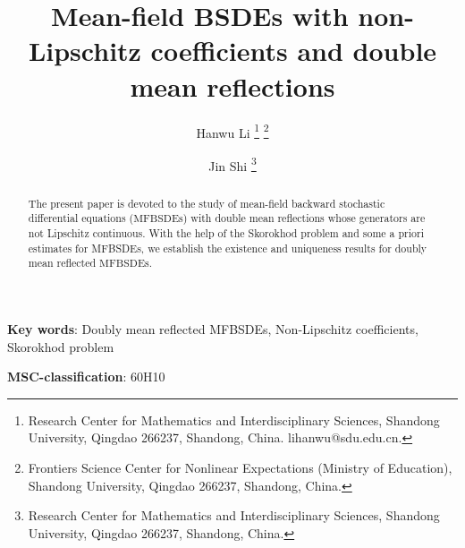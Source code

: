\documentclass[10pt]{article}%
\title{Mean-field BSDEs with non-Lipschitz coefficients and double mean reflections}
\numberwithin{equation}{section}
\begin{document}
	\author{ 	Hanwu Li \thanks{Research Center for Mathematics and Interdisciplinary Sciences, Shandong University, Qingdao 266237, Shandong, China. lihanwu@sdu.edu.cn.}
	\thanks{Frontiers Science Center for Nonlinear Expectations (Ministry of Education), Shandong University, Qingdao 266237, Shandong, China.}
    \and Jin Shi \thanks{Research Center for Mathematics and Interdisciplinary Sciences, Shandong University, Qingdao 266237, Shandong, China. }}
\maketitle
\begin{abstract}
     The present paper is devoted to the study of mean-field backward stochastic differential equations ($\text{MFBSDEs}$) with double mean reflections whose generators are not Lipschitz continuous. With the help of the Skorokhod problem and some a priori estimates for MFBSDEs, we establish the existence and uniqueness results for doubly mean reflected $\text{MFBSDEs}$.
	\end{abstract}
    
    \textbf{Key words}: Doubly mean reflected MFBSDEs, Non-Lipschitz coefficients, Skorokhod problem 

\textbf{MSC-classification}: 60H10
\end{document}
